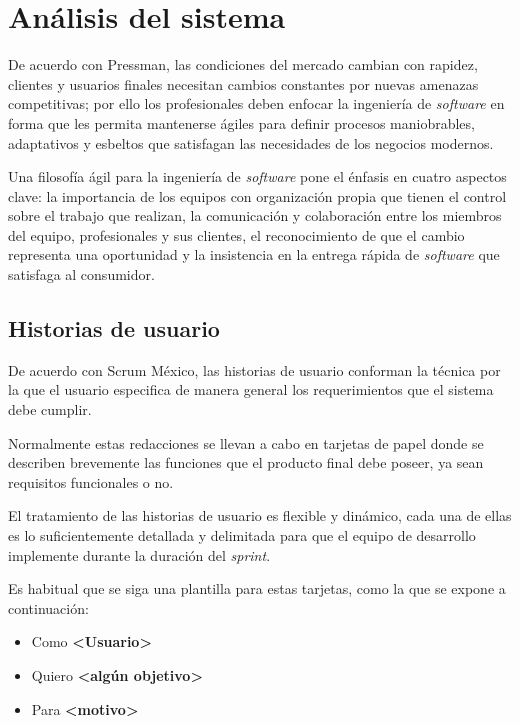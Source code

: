 \section{Análisis del sistema}
De acuerdo con Pressman\cite{pressman_software_2005}, las condiciones del mercado cambian con rapidez, clientes y usuarios finales necesitan cambios constantes por nuevas amenazas competitivas; por ello los profesionales deben enfocar la ingeniería de \textit{software} en forma que les permita mantenerse ágiles para definir procesos maniobrables, adaptativos y esbeltos que satisfagan las necesidades de los negocios modernos.


Una filosofía ágil para la ingeniería de \textit{software} pone el énfasis en cuatro aspectos clave: la importancia de los equipos con organización propia que tienen el control sobre el trabajo que realizan, la comunicación y colaboración entre los miembros del equipo, profesionales y sus clientes, el reconocimiento de que el cambio representa una oportunidad y la insistencia en la entrega rápida de \textit{software} que satisfaga al consumidor.


\subsection{Historias de usuario}\label{sec:historias-usuario}

De acuerdo con Scrum México\cite{mexico_scrum_2020}, las historias de usuario conforman la técnica por la que el usuario especifica de manera general los requerimientos que el sistema debe cumplir.


Normalmente estas redacciones se llevan a cabo en tarjetas de papel donde se describen brevemente las funciones que el producto final debe poseer, ya sean requisitos funcionales o no.


El tratamiento de las historias de usuario es flexible y dinámico, cada una de ellas es lo suficientemente detallada y delimitada para que el equipo de desarrollo implemente durante la duración del \textit{sprint}.


Es habitual que se siga una plantilla para estas tarjetas, como la que se expone a continuación:

\begin{itemize}
	\item Como \textbf{<Usuario>}
	\item Quiero \textbf{<algún objetivo>}
	\item Para \textbf{<motivo>}
\end{itemize}


